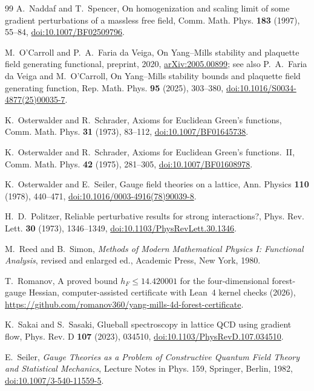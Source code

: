 \documentclass[aps,prd,twocolumn,superscriptaddress,nofootinbib,longbibliography,floatfix,amsmath,amssymb,10pt]{revtex4-2}
\theoremstyle{definition}
\theoremstyle{remark}
\begin{document}
\begin{thebibliography}{99}
A.~Naddaf and T.~Spencer, On homogenization and scaling limit of some
gradient perturbations of a massless free field, Comm. Math. Phys.
\textbf{183} (1997), 55--84,
\href{https://doi.org/10.1007/BF02509796}{doi:10.1007/BF02509796}.

M.~O'Carroll and P.~A.~Faria da Veiga, On Yang--Mills stability and plaquette
field generating functional, preprint, 2020,
\href{https://arxiv.org/abs/2005.00899}{arXiv:2005.00899}; see also
P.~A.~Faria da Veiga and M.~O'Carroll, On Yang--Mills stability bounds and
plaquette field generating function, Rep. Math. Phys. \textbf{95} (2025),
303--380,
\href{https://doi.org/10.1016/S0034-4877(25)00035-7}{doi:10.1016/S0034-4877(25)00035-7}.

K.~Osterwalder and R.~Schrader, Axioms for Euclidean Green's functions,
Comm. Math. Phys. \textbf{31} (1973), 83--112,
\href{https://doi.org/10.1007/BF01645738}{doi:10.1007/BF01645738}.

K.~Osterwalder and R.~Schrader, Axioms for Euclidean Green's functions.~II,
Comm. Math. Phys. \textbf{42} (1975), 281--305,
\href{https://doi.org/10.1007/BF01608978}{doi:10.1007/BF01608978}.

K.~Osterwalder and E.~Seiler, Gauge field theories on a lattice, Ann. Physics
\textbf{110} (1978), 440--471,
\href{https://doi.org/10.1016/0003-4916(78)90039-8}{doi:10.1016/0003-4916(78)90039-8}.

H.~D.~Politzer, Reliable perturbative results for strong interactions?,
Phys. Rev. Lett. \textbf{30} (1973), 1346--1349,
\href{https://doi.org/10.1103/PhysRevLett.30.1346}{doi:10.1103/PhysRevLett.30.1346}.

M.~Reed and B.~Simon, \emph{Methods of Modern Mathematical Physics I:
Functional Analysis}, revised and enlarged ed., Academic Press, New York,
1980.

T.~Romanov, A proved bound $h_F\le14.420001$ for the four-dimensional
forest-gauge Hessian, computer-assisted certificate with Lean~4 kernel
checks (2026),
\url{https://github.com/romanov360/yang-mills-4d-forest-certificate}.

K.~Sakai and S.~Sasaki, Glueball spectroscopy in lattice QCD using gradient
flow, Phys. Rev. D \textbf{107} (2023), 034510,
\href{https://doi.org/10.1103/PhysRevD.107.034510}{doi:10.1103/PhysRevD.107.034510}.

E.~Seiler, \emph{Gauge Theories as a Problem of Constructive Quantum Field
Theory and Statistical Mechanics}, Lecture Notes in Phys. 159, Springer,
Berlin, 1982, \href{https://doi.org/10.1007/3-540-11559-5}{doi:10.1007/3-540-11559-5}.


\end{thebibliography}
\end{document}
